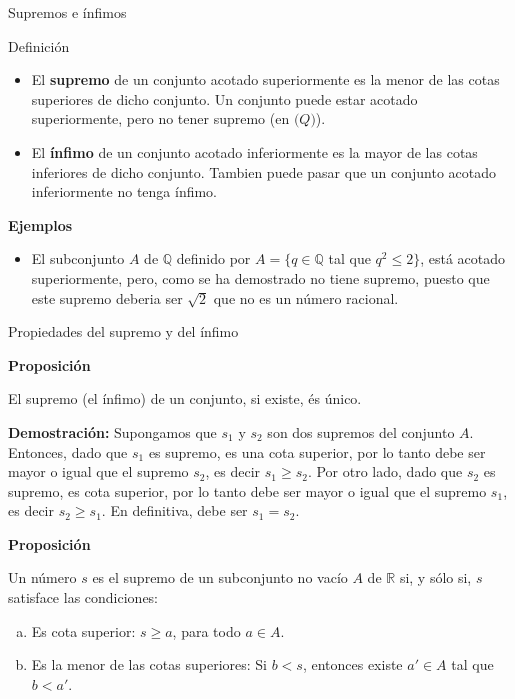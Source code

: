 \documentclass[ignorenonframetext,]{beamer}
\providecommand{\tightlist}{%
  \setlength{\itemsep}{0pt}\setlength{\parskip}{0pt}}
\begin{document}
\begin{frame}{Supremos e ínfimos}
\protect\hypertarget{supremos-e-uxednfimos}{}

Definición

\begin{itemize}
\item
  El \textbf{supremo} de un conjunto acotado superiormente es la menor
  de las cotas superiores de dicho conjunto. Un conjunto puede estar
  acotado superiormente, pero no tener supremo (en \(\mathbb(Q)\)).
\item
  El \textbf{ínfimo} de un conjunto acotado inferiormente es la mayor de
  las cotas inferiores de dicho conjunto. Tambien puede pasar que un
  conjunto acotado inferiormente no tenga ínfimo.
\end{itemize}

\textbf{Ejemplos}

\begin{itemize}
\tightlist
\item
  El subconjunto \(A\) de \(\mathbb{Q}\) definido por
  \(A =\{q \in \mathbb{Q}\) tal que \(q^2 \leq 2 \}\), está acotado
  superiormente, pero, como se ha demostrado no tiene supremo, puesto
  que este supremo deberia ser \(\sqrt{2}\) que no es un número
  racional.
\end{itemize}

\end{frame}

\begin{frame}{Propiedades del supremo y del ínfimo}
\protect\hypertarget{propiedades-del-supremo-y-del-uxednfimo}{}

\textbf{Proposición}

El supremo (el ínfimo) de un conjunto, si existe, és único.

\textbf{Demostración:} Supongamos que \(s_1\) y \(s_2\) son dos supremos
del conjunto \(A\). Entonces, dado que \(s_1\) es supremo, es una cota
superior, por lo tanto debe ser mayor o igual que el supremo \(s_2\), es
decir \(s_1 \geq s_2\). Por otro lado, dado que \(s_2\) es supremo, es
cota superior, por lo tanto debe ser mayor o igual que el supremo
\(s_1\), es decir \(s_2 \geq s_1\). En definitiva, debe ser \(s_1=s_2\).

\textbf{Proposición}

Un número \(s\) es el supremo de un subconjunto no vacío \(A\) de
\(\mathbb{R}\) si, y sólo si, \(s\) satisface las condiciones:

\begin{enumerate}
[a)]
\item
  Es cota superior: \(s\geq a\), para todo \(a \in A\).
\item
  Es la menor de las cotas superiores: Si \(b < s\), entonces existe
  \(a' \in A\) tal que \(b<a'\).
\end{enumerate}

\end{frame}
\end{document}
